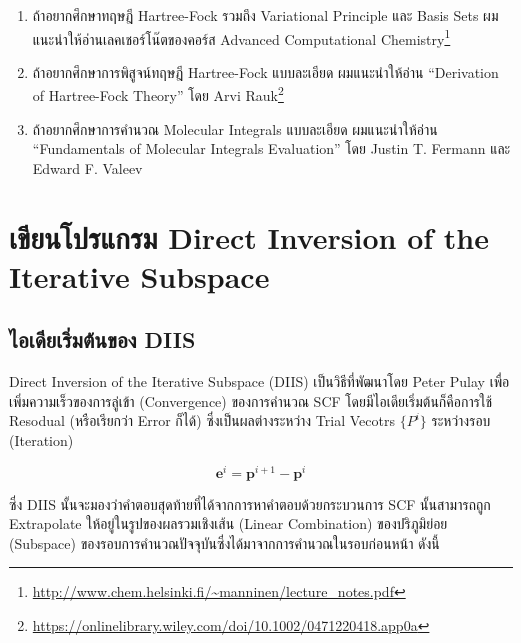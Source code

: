 \begin{enumerate}[topsep=0pt,noitemsep]
  \setlength\itemsep{1em}
  \item ถ้าอยากศึกษาทฤษฎี Hartree-Fock รวมถึง Variational Principle และ Basis Sets ผมแนะนำให้อ่านเลคเชอร์โน๊ตของคอร์ส
        Advanced Computational Chemistry\footnote{\url{http://www.chem.helsinki.fi/~manninen/lecture_notes.pdf}}

  \item ถ้าอยากศึกษาการพิสูจน์ทฤษฎี Hartree-Fock แบบละเอียด ผมแนะนำให้อ่าน \enquote{Derivation of Hartree-Fock Theory}
        โดย Arvi Rauk\footnote{\url{https://onlinelibrary.wiley.com/doi/10.1002/0471220418.app0a}}

  \item ถ้าอยากศึกษาการคำนวณ Molecular Integrals แบบละเอียด ผมแนะนำให้อ่าน \enquote{Fundamentals of Molecular
          Integrals Evaluation} โดย Justin T. Fermann และ Edward F. Valeev
\end{enumerate}

\section{เขียนโปรแกรม Direct Inversion of the Iterative Subspace}

\subsection{ไอเดียเริ่มต้นของ DIIS}

Direct Inversion of the Iterative Subspace (DIIS) เป็นวิธีที่พัฒนาโดย Peter Pulay เพื่อเพิ่มความเร็วของการลู่เข้า (Convergence) 
ของการคำนวณ SCF\autocite{pulay1980} โดยมีไอเดียเริ่มต้นก็คือการใช้ Resodual (หรือเรียกว่า Error ก็ได้) ซึ่งเป็นผลต่างระหว่าง 
Trial Vecotrs $\{ P^{i}\}$ ระหว่างรอบ (Iteration)

\begin{equation}
  \mathbf{e}^i 
  = 
  \mathbf{p}^{i+1} - \mathbf{p}^i
\end{equation}

\noindent ซึ่ง DIIS นั้นจะมองว่าคำตอบสุดท้ายที่ได้จากการหาคำตอบด้วยกระบวนการ SCF นั้นสามารถถูก Extrapolate ให้อยู่ในรูปของผลรวมเชิงเส้น 
(Linear Combination) ของปริภูมิย่อย (Subspace) ของรอบการคำนวณปัจจุบันซึ่งได้มาจากการคำนวณในรอบก่อนหน้า ดังนี้ 

